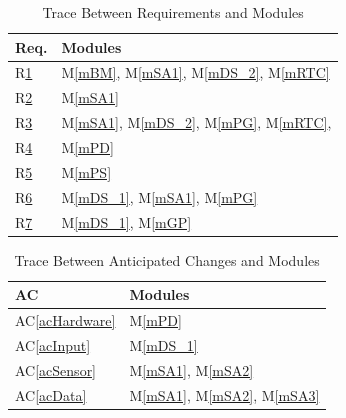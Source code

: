 \documentclass[12pt, titlepage]{article}
\newcommand{\acref}[1]{AC\ref{#1}}
\newcommand{\mref}[1]{M\ref{#1}}
\begin{document}
\begin{table}[H]
  \centering
  \begin{tabular}{p{} p{}}
    \toprule
    \textbf{Req.} & \textbf{Modules}                                                                           \\
    \midrule
    R\href{https://github.com/zakerl/Capstone_Project/blob/main/docs/SRS/SRS.pdf}{1}            & \mref{mBM}, \mref{mSA1}, \mref{mDS_2}, \mref{mRTC}                               \\
    R\href{https://github.com/zakerl/Capstone_Project/blob/main/docs/SRS/SRS.pdf}{2}            & \mref{mSA1} \\
    R\href{https://github.com/zakerl/Capstone_Project/blob/main/docs/SRS/SRS.pdf}{3}            & \mref{mSA1}, \mref{mDS_2}, \mref{mPG}, \mref{mRTC},                                                                             \\
    R\href{https://github.com/zakerl/Capstone_Project/blob/main/docs/SRS/SRS.pdf}{4}            & \mref{mPD}                                                    \\
    R\href{https://github.com/zakerl/Capstone_Project/blob/main/docs/SRS/SRS.pdf}{5}            & \mref{mPS} \\
    R\href{https://github.com/zakerl/Capstone_Project/blob/main/docs/SRS/SRS.pdf}{6}            &\mref{mDS_1}, \mref{mSA1}, \mref{mPG}\\
    R\href{https://github.com/zakerl/Capstone_Project/blob/main/docs/SRS/SRS.pdf}{7}           &\mref{mDS_1}, \mref{mGP}             \\
    \bottomrule
  \end{tabular}
  \caption{Trace Between Requirements and Modules}
  \label{TblRT}
\end{table}

\begin{table}[H]
  \centering
  \begin{tabular}{p{} p{}}
    \toprule
    \textbf{AC}         & \textbf{Modules}  \\
    \midrule
    \acref{acHardware}  & \mref{mPD}        \\
    \acref{acInput}     & \mref{mDS_1}     \\
    \acref{acSensor}     & \mref{mSA1}, \mref{mSA2}     \\
    \acref{acData}     & \mref{mSA1}, \mref{mSA2}, \mref{mSA3}    \\
    \bottomrule
  \end{tabular}
  \caption{Trace Between Anticipated Changes and Modules}
  \label{TblACT}
\end{table}
\end{document}
